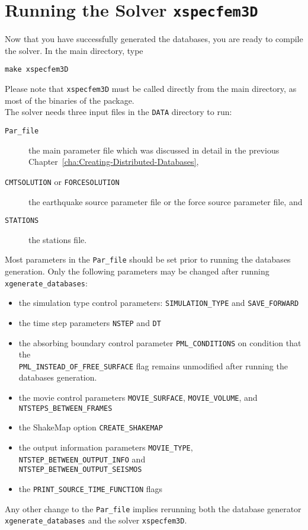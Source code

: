 \chapter{Running the Solver \texttt{xspecfem3D}}\label{cha:Running-the-Solver}

Now that you have successfully generated the databases, you are ready
to compile the solver. In the main directory, type
{\small
\begin{verbatim}
make xspecfem3D
\end{verbatim}
}
\noindent
Please note that \texttt{xspecfem3D} must be called directly from
the main directory, as most of the binaries of the package.\\

\noindent
The solver needs three input files in the \texttt{DATA} directory
to run:
\begin{description}
\item [{\texttt{Par\_file}}] the main parameter file which was discussed
in detail in the previous Chapter~\ref{cha:Creating-Distributed-Databases},
\item [{\texttt{CMTSOLUTION}} or {\texttt{FORCESOLUTION}}] the earthquake
source parameter file or the force source parameter file, and
\item [{\texttt{STATIONS}}] the stations file.
\end{description}
Most parameters in the \texttt{Par\_file} should be set prior to running
the databases generation. Only the following parameters may be changed
after running \texttt{xgenerate\_databases}:
\begin{itemize}
\item the simulation type control parameters: \texttt{SIMULATION\_TYPE}
and \texttt{SAVE\_FORWARD}
\item the time step parameters \texttt{NSTEP} and \texttt{DT}
\item the absorbing boundary control parameter \texttt{PML\_CONDITIONS}
on condition that the\\
 \texttt{PML\_INSTEAD\_OF\_FREE\_SURFACE} flag remains unmodified
after running the databases generation.
\item the movie control parameters \texttt{MOVIE\_SURFACE}, \texttt{MOVIE\_VOLUME},
and \texttt{NTSTEPS\_BETWEEN\_FRAMES}
\item the ShakeMap\textregistered{} option \texttt{CREATE\_SHAKEMAP}
\item the output information parameters \texttt{MOVIE\_TYPE}, \texttt{NTSTEP\_BETWEEN\_OUTPUT\_INFO} and\\
\texttt{NTSTEP\_BETWEEN\_OUTPUT\_SEISMOS}
\item the \texttt{PRINT\_SOURCE\_TIME\_FUNCTION} flags
\end{itemize}
Any other change to the \texttt{Par\_file} implies rerunning both
the database generator \texttt{xgenerate\_databases} and the solver
\texttt{xspecfem3D}.


